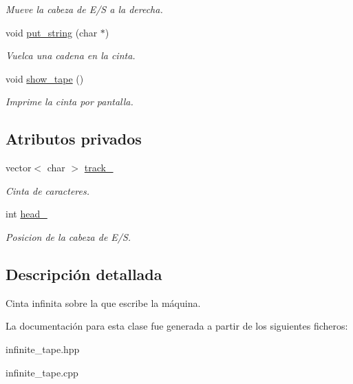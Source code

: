 \begin{DoxyCompactItemize}
\begin{DoxyCompactList}\small\item\em Mueve la cabeza de E/\+S a la derecha. \end{DoxyCompactList}\item 
\hypertarget{classinfinite__tape_a5ff2dae6423cc61969686c5756844e10}{}void \hyperlink{classinfinite__tape_a5ff2dae6423cc61969686c5756844e10}{put\+\_\+string} (char $\ast$)\label{classinfinite__tape_a5ff2dae6423cc61969686c5756844e10}

\begin{DoxyCompactList}\small\item\em Vuelca una cadena en la cinta. \end{DoxyCompactList}\item 
\hypertarget{classinfinite__tape_acba29e0cf1e82b26a5c24e2b641802f3}{}void \hyperlink{classinfinite__tape_acba29e0cf1e82b26a5c24e2b641802f3}{show\+\_\+tape} ()\label{classinfinite__tape_acba29e0cf1e82b26a5c24e2b641802f3}

\begin{DoxyCompactList}\small\item\em Imprime la cinta por pantalla. \end{DoxyCompactList}\end{DoxyCompactItemize}
\subsection*{Atributos privados}
\begin{DoxyCompactItemize}
\item 
\hypertarget{classinfinite__tape_a9a7494449ea97e53921fedbf99cd4f06}{}vector$<$ char $>$ \hyperlink{classinfinite__tape_a9a7494449ea97e53921fedbf99cd4f06}{track\+\_\+}\label{classinfinite__tape_a9a7494449ea97e53921fedbf99cd4f06}

\begin{DoxyCompactList}\small\item\em Cinta de caracteres. \end{DoxyCompactList}\item 
\hypertarget{classinfinite__tape_a4e9009752b182a20240c8c9a9765d967}{}int \hyperlink{classinfinite__tape_a4e9009752b182a20240c8c9a9765d967}{head\+\_\+}\label{classinfinite__tape_a4e9009752b182a20240c8c9a9765d967}

\begin{DoxyCompactList}\small\item\em Posicion de la cabeza de E/\+S. \end{DoxyCompactList}\end{DoxyCompactItemize}


\subsection{Descripción detallada}
Cinta infinita sobre la que escribe la máquina. 

La documentación para esta clase fue generada a partir de los siguientes ficheros\+:\begin{DoxyCompactItemize}
\item 
infinite\+\_\+tape.\+hpp\item 
infinite\+\_\+tape.\+cpp\end{DoxyCompactItemize}
